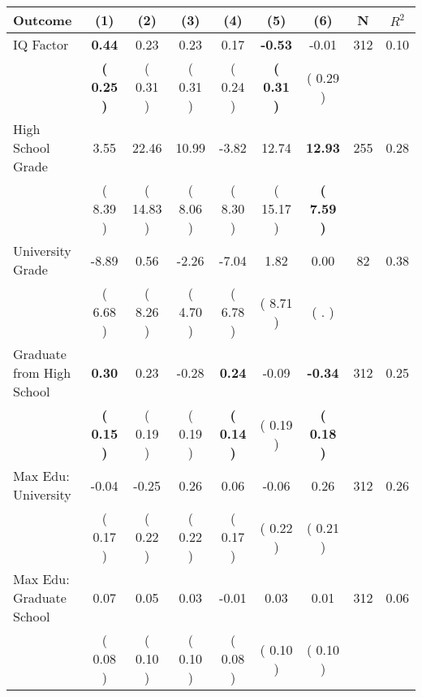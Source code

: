 \begin{tabular}{lcccccccc}
\toprule
 \textbf{Outcome} & \textbf{(1)} & \textbf{(2)} & \textbf{(3)} & \textbf{(4)} & \textbf{(5)} & \textbf{(6)} & \textbf{N} & \textbf{$ R^2$} \\
\midrule
IQ Factor & \textbf{     0.44} &      0.23 &      0.23 &      0.17 & \textbf{    -0.53} &     -0.01 & 312 &       0.10 \\ 
 & \textbf{(     0.25 )} & (     0.31 ) & (     0.31 ) & (     0.24 ) & \textbf{(     0.31 )} & (     0.29 ) & \\
High School Grade &      3.55 &     22.46 &     10.99 &     -3.82 &     12.74 & \textbf{    12.93} & 255 &       0.28 \\ 
 & (     8.39 ) & (    14.83 ) & (     8.06 ) & (     8.30 ) & (    15.17 ) & \textbf{(     7.59 )} & \\
University Grade &     -8.89 &      0.56 &     -2.26 &     -7.04 &      1.82 &      0.00 & 82 &       0.38 \\ 
 & (     6.68 ) & (     8.26 ) & (     4.70 ) & (     6.78 ) & (     8.71 ) & (        . ) & \\
Graduate from High School & \textbf{     0.30} &      0.23 &     -0.28 & \textbf{     0.24} &     -0.09 & \textbf{    -0.34} & 312 &       0.25 \\ 
 & \textbf{(     0.15 )} & (     0.19 ) & (     0.19 ) & \textbf{(     0.14 )} & (     0.19 ) & \textbf{(     0.18 )} & \\
Max Edu: University &     -0.04 &     -0.25 &      0.26 &      0.06 &     -0.06 &      0.26 & 312 &       0.26 \\ 
 & (     0.17 ) & (     0.22 ) & (     0.22 ) & (     0.17 ) & (     0.22 ) & (     0.21 ) & \\
Max Edu: Graduate School &      0.07 &      0.05 &      0.03 &     -0.01 &      0.03 &      0.01 & 312 &       0.06 \\ 
 & (     0.08 ) & (     0.10 ) & (     0.10 ) & (     0.08 ) & (     0.10 ) & (     0.10 ) & \\
\bottomrule
\end{tabular}
